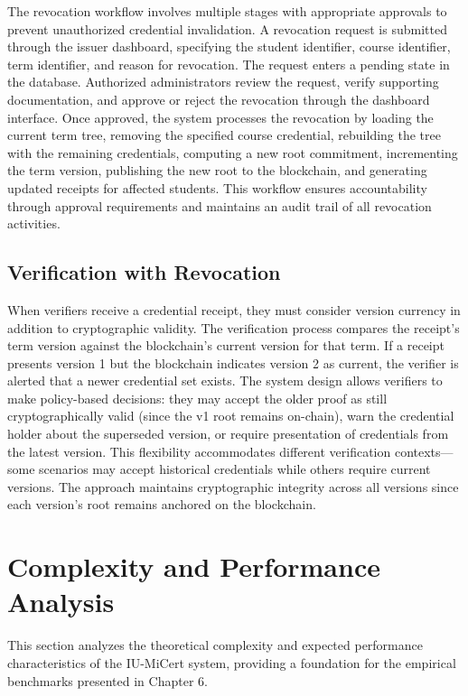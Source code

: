 The revocation workflow involves multiple stages with appropriate approvals to prevent unauthorized credential invalidation. A revocation request is submitted through the issuer dashboard, specifying the student identifier, course identifier, term identifier, and reason for revocation. The request enters a pending state in the database. Authorized administrators review the request, verify supporting documentation, and approve or reject the revocation through the dashboard interface. Once approved, the system processes the revocation by loading the current term tree, removing the specified course credential, rebuilding the tree with the remaining credentials, computing a new root commitment, incrementing the term version, publishing the new root to the blockchain, and generating updated receipts for affected students. This workflow ensures accountability through approval requirements and maintains an audit trail of all revocation activities.

\subsection{Verification with Revocation}
\label{subsec:verification-revocation}

When verifiers receive a credential receipt, they must consider version currency in addition to cryptographic validity. The verification process compares the receipt's term version against the blockchain's current version for that term. If a receipt presents version 1 but the blockchain indicates version 2 as current, the verifier is alerted that a newer credential set exists. The system design allows verifiers to make policy-based decisions: they may accept the older proof as still cryptographically valid (since the v1 root remains on-chain), warn the credential holder about the superseded version, or require presentation of credentials from the latest version. This flexibility accommodates different verification contexts—some scenarios may accept historical credentials while others require current versions. The approach maintains cryptographic integrity across all versions since each version's root remains anchored on the blockchain.

\section{Complexity and Performance Analysis}
\label{sec:complexity-analysis}

This section analyzes the theoretical complexity and expected performance characteristics of the IU-MiCert system, providing a foundation for the empirical benchmarks presented in Chapter 6.

